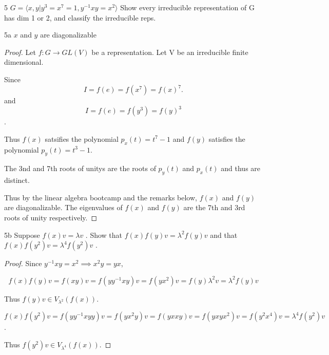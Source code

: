\documentclass{article}
\newcommand{\angles}[1]{\langle #1 \rangle}
\begin{document}
\bigskip

\begin{PROB}{5}\label{Problem 5.}
    $G = \angles{x,y| y^3=x^7=1, y^{-1}xy = x^2}$
    Show every irreducible representation of G has dim 1 or 2, and classify the irreducible reps.
\end{PROB}
\begin{PROB}{5a}\label{Problem 5a.}
    $x$ and $y$ are diagonalizable  
\end{PROB}
\begin{proof}
    Let $f: G \to GL(V)$ be a representation. 
    Let V be an irreducible finite dimensional.

    Since \[
        I = f(e) = f(x^7) = f(x)^7.
    \] and \[
        I = f(e) = f(y^3) = f(y)^3
    \].

    Thus $f(x)$ satsifies the polynomial $p_x(t) = t^7 - 1$ and $f(y)$ satisfies the polynomial $p_y(t) = t^3 - 1$.
    
    The 3nd and 7th roots of unitys are the roots of $p_y(t)$ and $p_x(t)$ and thus are distinct.
    
    Thus by the linear algebra bootcamp and the remarks below, $f(x)$ and $f(y)$ are diagonalizable. The eigenvalues of $f(x)$ and $f(y)$ are the 7th and 3rd roots of unity respectively.   
\end{proof}
\begin{claim}{5b}\label{Claim 5b.}
    Suppose $f(x)v = \lambda v$ .
    Show that $f(x)f(y)v = \lambda^2 f(y)v$ and that $f(x)f(y^2) v = \lambda^4 f(y^2)v$ . 
\end{claim}
\begin{proof}  
    Since $y^{-1}xy = x^{2} \implies x^2y = yx$, 

    \[f(x)f(y)v = f(xy)v = f(y y^{-1} x y)v = f(yx^2)v = f(y)\lambda^2v = \lambda^2 f(y) v\]

    Thus $f(y)v \in V_{\lambda^2}(f(x))$. 
    
    
    \[
        f(x)f(y^2)v = f(y y^{-1} x y y)v = f(y x^2 y)v = f(y x x y)v = f(y x y x^2) v =f(y^2 x^4) v = \lambda^4 f(y^2) v
    \].

    Thus $f(y^2)v \in V_{\lambda^4}(f(x))$. 
\end{proof}

         
\end{document}
